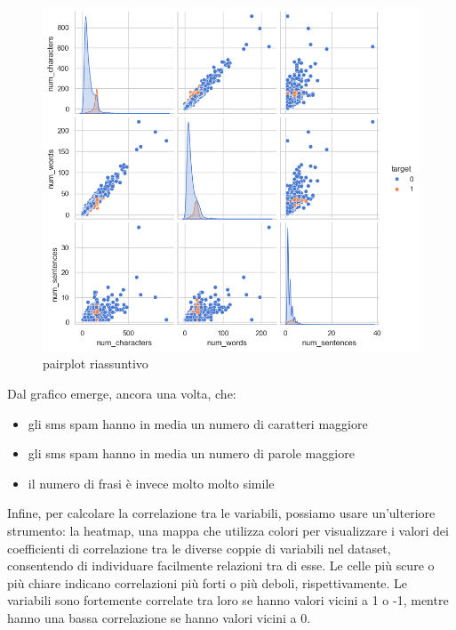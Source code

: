 \documentclass[]{article}
\begin{document}
        \begin{figure}[H]
            \centering
            \includegraphics[width=1\linewidth]{images/sns_riassuntivo.png}
            \caption{pairplot riassuntivo}
            \label{fig:enter-label}
        \end{figure}

        Dal grafico emerge, ancora una volta, che:
        \begin{itemize}
        \item gli sms spam hanno in media un numero di caratteri maggiore
        \item gli sms spam hanno in media un numero di parole maggiore
        \item il numero di frasi è invece molto molto simile
        \end{itemize}

        Infine, per calcolare la correlazione tra le variabili, possiamo usare un'ulteriore strumento: la heatmap, una mappa che utilizza colori per visualizzare i valori dei coefficienti di correlazione tra le diverse coppie di variabili nel dataset, consentendo di individuare facilmente relazioni tra di esse. Le celle più scure o più chiare indicano correlazioni più forti o più deboli, rispettivamente. Le variabili sono fortemente correlate tra loro se hanno valori vicini a 1 o -1, mentre hanno una bassa correlazione se hanno valori vicini a 0.
\end{document}
